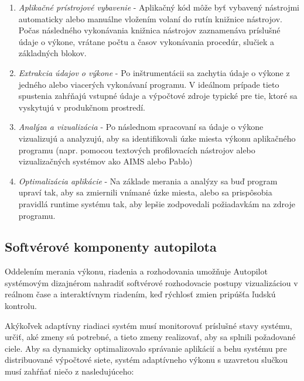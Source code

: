\documentclass[10pt,twoside,slovak,a4paper]{article}
\begin{document}
\begin{enumerate}
\item \emph{Aplikačné prístrojové vybavenie} - Aplikačný kód môže byť vybavený nástrojmi automaticky alebo manuálne vložením volaní do rutín knižnice nástrojov. Počas následného vykonávania knižnica nástrojov zaznamenáva príslušné údaje o výkone, vrátane počtu a časov vykonávania procedúr, slučiek a základných blokov.
\item\emph{Extrakcia údajov o výkone} - Po inštrumentácii sa zachytia údaje o výkone z jedného alebo viacerých vykonávaní programu. V ideálnom prípade tieto spustenia zahŕňajú vstupné údaje a výpočtové zdroje typické pre tie, ktoré sa vyskytujú v produkčnom prostredí.
\item\emph{Analýza a vizualizácia} - Po následnom spracovaní sa údaje o výkone vizualizujú a analyzujú, aby sa identifikovali úzke miesta výkonu aplikačného programu (napr. pomocou textových profilovacích nástrojov alebo vizualizačných systémov ako AIMS  alebo Pablo)
\item\emph{Optimalizácia aplikácie} - Na základe merania a analýzy sa buď program upraví tak, aby sa zmiernili vnímané úzke miesta, alebo sa prispôsobia pravidlá runtime systému tak, aby lepšie zodpovedali požiadavkám na zdroje programu. \cite{SoftverAutopilot}
\end{enumerate}

\subsection{Softvérové komponenty autopilota}

Oddelením merania výkonu, riadenia a rozhodovania umožňuje Autopilot systémovým dizajnérom nahradiť softvérové rozhodovacie postupy vizualizáciou v reálnom čase a interaktívnym riadením, keď rýchlosť zmien pripúšťa ľudskú kontrolu.

Akýkoľvek adaptívny riadiaci systém musí monitorovať príslušné stavy systému, určiť, aké zmeny sú potrebné, a tieto zmeny realizovať, aby sa splnili požadované ciele. Aby sa dynamicky optimalizovalo správanie aplikácií a behu systému pre distribuované výpočtové siete, systém adaptívneho výkonu s uzavretou slučkou musí zahŕňať
niečo z nasledujúceho:
\end{document}
